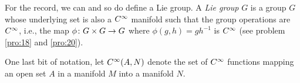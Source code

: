 \documentclass[../main]{subfiles}
\begin{document}
For the record, we can and so do define a Lie group. A \emph{Lie group} $G$ is a group $G$ whose underlying set is also a $C^\infty$ manifold such that the group operations are $C^\infty$, i.e., the map $\phi\colon G\times G\to G$ where $\phi(g,h)=gh^{-1}$ is $C^\infty$ (see problem \ref{pro:18} and \ref{pro:20}). %

One last bit of notation, let $C^\infty(A,N)$ denote the set of $C^\infty$ functions mapping an open set $A$ in a manifold $M$ into a manifold $N$.
\end{document}
